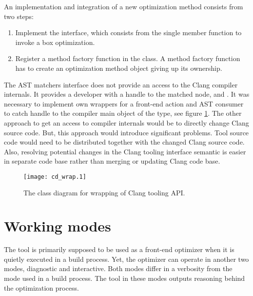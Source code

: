 An implementation and integration of a new optimization method consists from two steps:
\begin{enumerate}
\item Implement the  interface, which consists from the single member function to invoke a box optimization.
\item Register a method factory function in the  class. A method factory function has to create an optimization method object giving up its ownership.
\end{enumerate}

The AST matchers interface does not provide an access to the Clang compiler internals. It provides a developer with a handle to the matched node,  and . It was necessary to implement own wrappers for a front-end action and AST consumer to catch handle to the compiler main object of the  type, see figure \ref{class-interface}. The other approach to get an access to compiler internals would be to directly change Clang source code. But, this approach would introduce significant problems. Tool source code would need to be distributed together with the changed Clang source code. Also, resolving potential changes in the Clang tooling interface semantic is easier in separate code base rather than merging or updating Clang code base.

\begin{figure}[h!]
\caption{The class diagram for wrapping of Clang tooling API.}
\label{class-interface}
\vspace{0.5cm}
\centering
\texttt{[image: cd\_wrap.1]}
\end{figure}

\section{Working modes}
The tool is primarily supposed to be used as a front-end optimizer when it is quietly executed in a build process. Yet, the optimizer can operate in another two modes, diagnostic and interactive. Both modes differ in a verbosity from the mode used in a build process. The tool in these modes outputs reasoning behind the optimization process.

